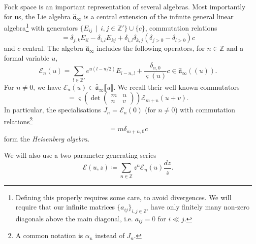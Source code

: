 \documentclass[10pt,a4paper,oneside,no-math,reqno]{amsart}%
\theoremstyle{plain}
\theoremstyle{definition}
\theoremstyle{remark}
\numberwithin{equation}{section}
\newcommand{\mb}[1]{\mathbb{#1}}
\newcommand{\mf}[1]{\mathfrak{#1}}
\newcommand{\mc}[1]{\mathcal{#1}}
\newcommand{\1}{\mathds{1}}
\newcommand{\Z}{\mb{Z}}
\newcommand{\<}{\langle}
\renewcommand{\>}{\rangle}
\begin{document}
Fock space is an important representation of several algebras.
Most importantly for us, the Lie algebra $ \widehat{\mf{a}}_\infty$ is a central extension of the infinite general linear algebra\footnote{Defining this properly requires some care, to avoid divergences. We will require that our infinite matrices $ \{ a_{ij} \}_{i,j \in \Z'} $ have only finitely many non-zero diagonals above the main diagonal, i.e. $ a_{ij} = 0 $ for $ i \ll j$.} with generators $ \{ E_{ij} \, \mid \, i, j \in \Z ' \} \cup \{ c\}$, commutation relations
\begin{equation}
    [ E_{ij}, E_{kl} ]
    =
    \delta_{j,k} E_{il} - \delta_{i,l} E_{kj} + \delta_{i,l} \delta_{k,j} (\delta_{j > 0} - \delta_{l > 0} ) c
\end{equation}
and $c$ central. The algebra $ \widehat{\mf{a}}_\infty$ includes the following operators, for $ n \in \Z $ and a formal variable $u$,
\begin{equation}
    \mathcal{E}_n(u)
    =
    \sum_{l\in\mathbb{Z}'}e^{u(l-n/2)}E_{l-n,l}+\frac{\delta_{n,0}}{\varsigma(u)} c 
    \in
    \widehat{\mf{a}}_\infty ((u)) .
\end{equation}
For $n\ne0$, we have $\mathcal{E}_n(u)\in\widehat{\mf{a}}_\infty\llbracket u\rrbracket$.
We recall their well-known commutators
\begin{equation}
    [\mathcal{E}_m(u),\mathcal{E}_n(v)]
    =
    \varsigma\left(\det \begin{pmatrix}
        m & u\\n & v
    \end{pmatrix}\right) 
    \mc{E}_{m+n} (u+v).
\end{equation}
In particular, the specialisations $ J_n = \mathcal{E}_n(0)$ (for $ n \neq 0$) with commutation relations\footnote{A common notation is $ \alpha_n $ instead of $J_n$.}
\begin{equation}
    [J_m , J_n]
    =
    m \delta_{m+n,0} c
\end{equation}
form the \emph{Heisenberg algebra}.

We will also use a two-parameter generating series
\begin{equation}
    \mc{E}(u,z)
    \coloneqq
    \sum_{n \in \Z } z^n \mc{E}_n (u)\frac{dz}{z}.
\end{equation}
\end{document}
